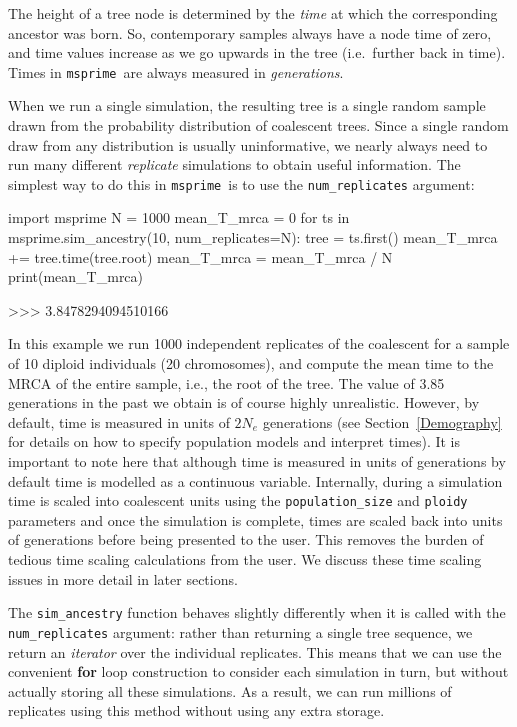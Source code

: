 \documentclass[graybox]{svmult}
\newcommand{\msprime}[0]{\texttt{msprime}}
\begin{document}
The height of a tree node is determined by the \emph{time} at which the corresponding
ancestor was born. So,
contemporary samples always have a node time of zero, and time values
increase as we go upwards in the tree (i.e.\ further back in time). Times
in \msprime\ are always measured in \emph{generations}.

When we run a single simulation, the resulting tree is a single random
sample drawn from the probability distribution of coalescent trees. Since a
single random draw from any distribution is usually uninformative, we
nearly always need to run many different \emph{replicate} simulations to
obtain useful information. The simplest way to do this in \msprime\ is to
use the \texttt{num\_replicates} argument:

\begin{pythoncode}
import msprime
N = 1000
mean_T_mrca = 0
for ts in msprime.sim_ancestry(10, num_replicates=N):
    tree = ts.first()
    mean_T_mrca += tree.time(tree.root)
mean_T_mrca = mean_T_mrca / N
print(mean_T_mrca)

>>> 3.8478294094510166
\end{pythoncode}

In this example we run 1000 independent replicates of the coalescent for
a sample of 10 diploid individuals (20 chromosomes),
and compute the mean time to the MRCA of the entire sample, i.e., the root of the
tree. The value of 3.85 generations in the past we obtain is of course highly unrealistic.
However, by default, time is measured in units of \(2 N_e\) generations (see Section~\ref{Demography}
for details on how to specify population models and interpret times). It is important to note here
that although time is measured in units of generations by default time is modelled as a continuous variable. Internally,
during a simulation time is scaled into coalescent units
using the \texttt{population\_size} and \texttt{ploidy} parameters and once the
simulation is complete, times are scaled back into units of generations
before being presented to the user. This removes the burden of
tedious time scaling calculations from the user. We discuss these time
scaling issues in more detail in later sections.

The
\texttt{sim\_ancestry} function behaves slightly differently when it is
called with the \texttt{num\_replicates} argument: rather than returning
a single tree sequence, we return an \emph{iterator} over the individual
replicates. This means that we can use the
convenient \textbf{for} loop construction to consider each simulation in
turn, but without actually storing all these simulations. As a result,
we can run millions of replicates using this method without
using any extra storage.
\end{document}
